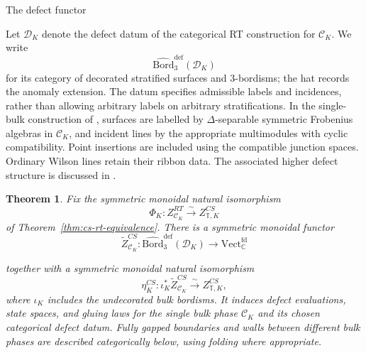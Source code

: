 \documentclass[12pt]{amsart}
\makeatletter
\renewcommand\subsection{\@startsection{subsection}{2}%
  \z@{.5\linespacing\@plus.7\linespacing}{-.5em}%
  {\normalfont\bfseries}}
\numberwithin{equation}{section}
\newtheorem{theorem}{Theorem}[section]
\theoremstyle{definition}
\makeatother
\begin{document}
\subsection{The defect functor}

Let $\mathcal D_K$ denote the defect datum of the categorical RT
construction for $\mathcal C_K$. We write
$$
\widehat{\mathrm{Bord}}^{\mathrm{def}}_3(\mathcal D_K)
$$
for its category of decorated stratified surfaces and $3$-bordisms;
the hat records the anomaly extension. The datum specifies admissible
labels and incidences, rather than allowing arbitrary labels on
arbitrary stratifications. In the single-bulk construction of
\cite{CRS2019}, surfaces are labelled by $\Delta$-separable symmetric
Frobenius algebras in $\mathcal C_K$, and incident lines by the
appropriate multimodules with cyclic compatibility. Point insertions
are included using the compatible junction spaces. Ordinary Wilson
lines retain their ribbon data. The associated  higher
defect structure is discussed in \cite{CMS2020}.

\begin{theorem}
\label{thm:defect-functor}
Fix the symmetric monoidal natural isomorphism
$$
\Phi_K:Z^{RT}_{\mathcal C_K}\xrightarrow{\sim}
Z^{CS}_{\mathbb T,K}
$$
of Theorem~\ref{thm:cs-rt-equivalence}. There is a symmetric monoidal
functor
\begin{equation}
\label{eq:defects-functor}
\widetilde Z^{CS}_{\mathcal C_K}:
\widehat{\mathrm{Bord}}^{\mathrm{def}}_3(\mathcal D_K)
\longrightarrow\mathrm{Vect}^{\mathrm{fd}}_{\mathbb C}
\end{equation}


together with a symmetric monoidal natural isomorphism
$$
\eta_K^{CS}:\iota_K^*\widetilde Z^{CS}_{\mathcal C_K}
\xrightarrow{\sim}Z^{CS}_{\mathbb T,K},
$$
where $\iota_K$ includes the undecorated bulk bordisms. It induces defect evaluations, state spaces, and gluing laws for the single bulk phase $\mathcal C_K$ and its chosen categorical defect datum. Fully gapped boundaries and walls between different bulk phases are described categorically below, using folding where appropriate.
\end{theorem}
\end{document}
